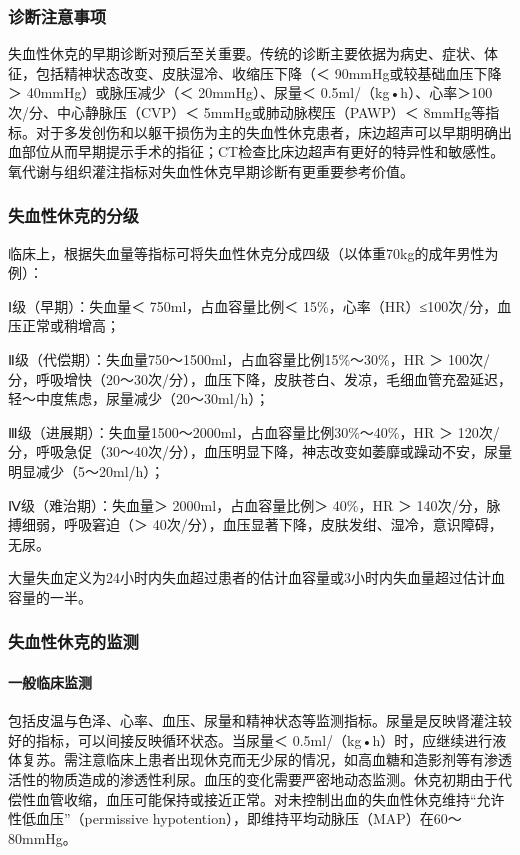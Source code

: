 \subsubsection{诊断注意事项}

失血性休克的早期诊断对预后至关重要。传统的诊断主要依据为病史、症状、体征，包括精神状态改变、皮肤湿冷、收缩压下降（＜
90mmHg或较基础血压下降＞ 40mmHg）或脉压减少（＜ 20mmHg）、尿量＜
0.5ml/（kg•h）、心率＞100次/分、中心静脉压（CVP）＜
5mmHg或肺动脉楔压（PAWP）＜
8mmHg等指标。对于多发创伤和以躯干损伤为主的失血性休克患者，床边超声可以早期明确出血部位从而早期提示手术的指征；CT检查比床边超声有更好的特异性和敏感性。氧代谢与组织灌注指标对失血性休克早期诊断有更重要参考价值。

\subsubsection{失血性休克的分级}

临床上，根据失血量等指标可将失血性休克分成四级（以体重70kg的成年男性为例）：

Ⅰ级（早期）：失血量＜ 750ml，占血容量比例＜
15\%，心率（HR）≤100次/分，血压正常或稍增高；

Ⅱ级（代偿期）：失血量750～1500ml，占血容量比例15\%～30\%，HR ＞
100次/分，呼吸增快（20～30次/分），血压下降，皮肤苍白、发凉，毛细血管充盈延迟，轻～中度焦虑，尿量减少（20～30ml/h）；

Ⅲ级（进展期）：失血量1500～2000ml，占血容量比例30\%～40\%，HR ＞
120次/分，呼吸急促（30～40次/分），血压明显下降，神志改变如萎靡或躁动不安，尿量明显减少（5～20ml/h）；

Ⅳ级（难治期）：失血量＞ 2000ml，占血容量比例＞ 40\%，HR ＞
140次/分，脉搏细弱，呼吸窘迫（＞
40次/分），血压显著下降，皮肤发绀、湿冷，意识障碍，无尿。

大量失血定义为24小时内失血超过患者的估计血容量或3小时内失血量超过估计血容量的一半。

\subsubsection{失血性休克的监测}

\paragraph{一般临床监测}

包括皮温与色泽、心率、血压、尿量和精神状态等监测指标。尿量是反映肾灌注较好的指标，可以间接反映循环状态。当尿量＜
0.5ml/（kg•h）时，应继续进行液体复苏。需注意临床上患者出现休克而无少尿的情况，如高血糖和造影剂等有渗透活性的物质造成的渗透性利尿。血压的变化需要严密地动态监测。休克初期由于代偿性血管收缩，血压可能保持或接近正常。对未控制出血的失血性休克维持“允许性低血压”（permissive
hypotention），即维持平均动脉压（MAP）在60～80mmHg。

